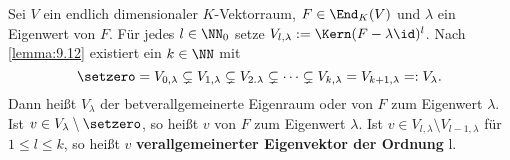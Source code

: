 \begin{definition}
	\label{def:9.13}
	Sei $V$ ein endlich dimensionaler $K$-Vektorraum, $F \in \End_K(V)$ und $\lambda$ ein Eigenwert von $F$.
	Für jedes $l \in \NN_0$ setze $V_{l,\lambda} := \Kern(F-\lambda \id)^l$.
	Nach \autoref{lemma:9.12} existiert ein $k \in \NN$ mit
	\[
		\setzero = V_{0,\lambda} \subsetneq V_{1,\lambda} \subsetneq V_{2.\lambda} \subsetneq \cdots \subsetneq V_{k,\lambda} = V_{k+1,\lambda} =: V_\lambda.
	\]
	\newpage
	Dann heißt $V_\lambda$ der bet{verallgemeinerte Eigenraum} oder  von $F$ zum Eigenwert $\lambda$. 
	Ist $v \in V_\lambda \setminus \setzero$, so heißt $v$  von $F$ zum Eigenwert $\lambda$.
	Ist $v \in V_{l,\lambda} \setminus V_{l-1,\lambda}$ für $1 \leq l \leq k$, so heißt $v$ \textbf{verallgemeinerter Eigenvektor der Ordnung} l.
\end{definition}

